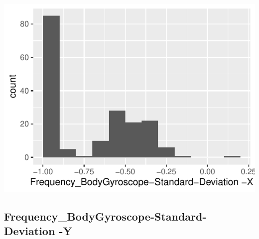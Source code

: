 \documentclass[
]{article}
\begin{document}
\begin{minipage}{0.25 \textwidth}

\includegraphics{codebook_tidydatasub_files/figure-latex/Var-64-Frequency-BodyGyroscope-Standard-Deviation--X-1.pdf}

\end{minipage}

\noindent\makebox[\linewidth]{\rule{\textwidth}{0.4pt}}

\hypertarget{frequency_bodygyroscope-standard-deviation--y}{%
\subsection{Frequency\_BodyGyroscope-Standard-Deviation
-Y}\label{frequency_bodygyroscope-standard-deviation--y}}
\end{document}
